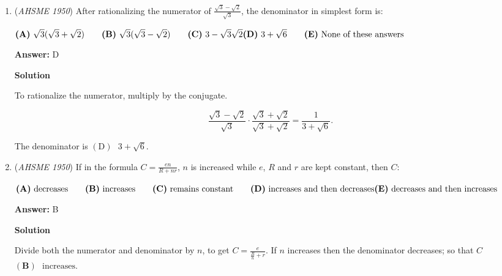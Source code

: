 \begin{enumerate}
 $\textbf{(A)}\ r^{2}\qquad\textbf{(B)}\ r^{3}\qquad\textbf{(C)}\ 2r^{2}\qquad\textbf{(D)}\ 2r^{3}\qquad\textbf{(E)}\ \frac{1}{2}r^{2}$

 \textbf{Answer: }A



\textbf{Solution}

The area of a triangle is $\frac12 bh.$ To maximize the base, let it be equal to the diameter of the semi circle, which is equal to $2r.$ To maximize the height, or altitude, choose the point directly in the middle of the arc connecting the endpoints of the diameter. It is equal to $r.$ Therefore the area is $\frac12 \cdot 2r \cdot r = \boxed{\mathrm{(A) }r^2}$.

 


	\item (\textit{AHSME 1950}) After rationalizing the numerator of $\frac{\sqrt{3}-\sqrt{2}}{\sqrt{3}}$, the denominator in simplest form is:


 $\textbf{(A)}\ \sqrt{3}(\sqrt{3}+\sqrt{2})\qquad\textbf{(B)}\ \sqrt{3}(\sqrt{3}-\sqrt{2})\qquad\textbf{(C)}\ 3-\sqrt{3}\sqrt{2}\qquad\\ \textbf{(D)}\ 3+\sqrt6\qquad\textbf{(E)}\ \text{None of these answers}$

 \textbf{Answer: }D



\textbf{Solution}

To rationalize the numerator, multiply by the conjugate.

 
 \[\frac{\sqrt3 - \sqrt2}{\sqrt3}\cdot \frac{\sqrt3 + \sqrt2}{\sqrt3 + \sqrt2} = \frac{1}{3+\sqrt6}.\]

 The denominator is $\boxed{\mathrm{(D)}\text{ } 3+\sqrt6 }.$



	\item (\textit{AHSME 1950}) If in the formula $C =\frac{en}{R+nr}$, $n$ is increased while $e$, $R$ and $r$ are kept constant, then $C$:


 $\textbf{(A)}\ \text{decreases}\qquad\textbf{(B)}\ \text{increases}\qquad\textbf{(C)}\ \text{remains constant}\qquad\textbf{(D)}\ \text{increases and then decreases}\qquad\\ \textbf{(E)}\ \text{decreases and then increases}$

 \textbf{Answer: }B



\textbf{Solution}

Divide both the numerator and denominator by $n$, to get $C=\frac{e}{\frac{R}{n}+r}$.  If $n$ increases then the denominator decreases; so that $C$ $\boxed{\mathbf{(B)}\text{ }\mathrm{ increases}.}$




\end{enumerate}
